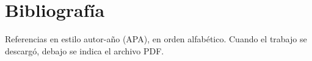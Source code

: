 \documentclass[11pt,a4paper,oneside]{report}
\begin{document}








\chapter*{Bibliografía}
Referencias en estilo autor-año (APA), en orden alfabético. Cuando el trabajo se descargó,
debajo se indica el archivo PDF.
\renewcommand{\bibsection}{}
{\raggedright}


\end{document}
